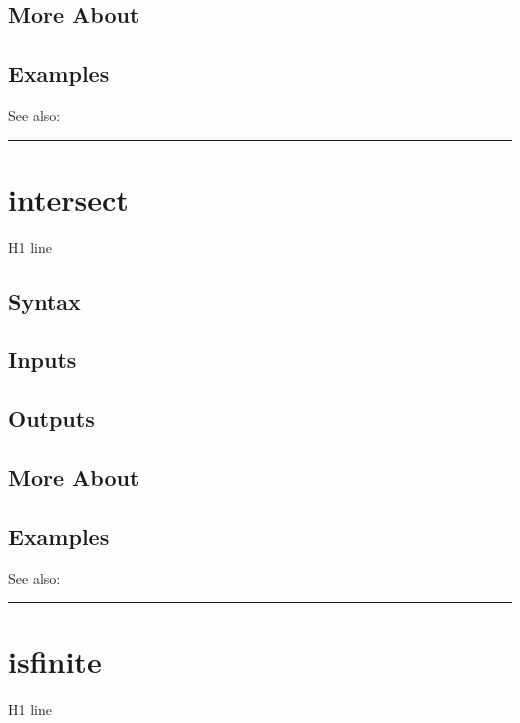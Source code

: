 \documentclass[letterpaper,10pt,english]{sphinxmanual}
\begin{document}
\subsection{More About}
\label{classes/time_series/@ts/ts:id287}

\subsection{Examples}
\label{classes/time_series/@ts/ts:id288}
See also:


\bigskip\hrule{}\bigskip



\section{intersect}
\label{classes/time_series/@ts/ts:id289}\label{classes/time_series/@ts/ts:intersect}
H1 line


\subsection{Syntax}
\label{classes/time_series/@ts/ts:id290}

\subsection{Inputs}
\label{classes/time_series/@ts/ts:id291}

\subsection{Outputs}
\label{classes/time_series/@ts/ts:id292}

\subsection{More About}
\label{classes/time_series/@ts/ts:id293}

\subsection{Examples}
\label{classes/time_series/@ts/ts:id294}
See also:


\bigskip\hrule{}\bigskip



\section{isfinite}
\label{classes/time_series/@ts/ts:id295}\label{classes/time_series/@ts/ts:isfinite}
H1 line
\end{document}
